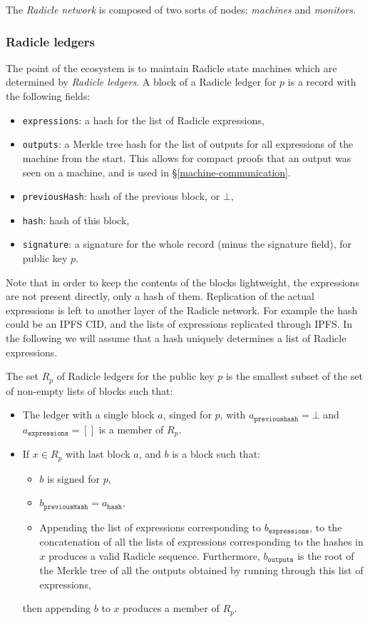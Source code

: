 \documentclass[a4paper, oneside, 10pt]{amsart}
\begin{document}
The \emph{Radicle network} is composed of two sorts of nodes: \emph{machines}
and \emph{monitors}.

\subsubsection{Radicle ledgers}

The point of the ecosystem is to maintain Radicle state machines which are
determined by \emph{Radicle ledgers}. A block of a Radicle ledger for $p$ is a
record with the following fields:
\begin{itemize}
\item
  \texttt{expressions}: a hash for the list of Radicle expressions,
\item
  \texttt{outputs}: a Merkle tree hash for the list of outputs for all
  expressions of the machine from the start. This allows for compact proofs that
  an output was seen on a machine, and is used in \S\ref{machine-communication}.
\item
  \texttt{previousHash}: hash of the previous block, or $\bot$,
\item
  \texttt{hash}: hash of this block,
\item
  \texttt{signature}: a signature for the whole record (minus the signature
  field), for public key $p$.
\end{itemize}

Note that in order to keep the contents of the blocks lightweight, the
expressions are not present directly, only a hash of them. Replication of the
actual expressions is left to another layer of the Radicle network. For example
the hash could be an IPFS CID, and the lists of expressions replicated through
IPFS. In the following we will assume that a hash uniquely determines a list of
Radicle expressions.

The set $R_p$ of Radicle ledgers for the public key $p$ is the smallest subset
of the set of non-empty lists of blocks such that:
\begin{itemize}
\item
  The ledger with a single block $a$, singed for $p$, with
  $a_\mathtt{previoushash} = \bot$ and $a_\mathtt{expressions} = []$ is a member
  of $R_p$.
\item
  If $x \in R_p$ with last block $a$, and $b$ is a block such that:
  \begin{itemize}
  \item
    $b$ is signed for $p$,
  \item
    $b_\mathtt{previousHash} = a_\mathtt{hash}$,
  \item
    Appending the list of expressions corresponding to $b_\mathtt{expressions}$,
    to the concatenation of all the lists of expressions corresponding to the
    hashes in $x$ produces a valid Radicle sequence. Furthermore,
    $b_\mathtt{outputs}$ is the root of the Merkle tree of all the outputs
    obtained by running through this list of expressions,
  \end{itemize}
  then appending $b$ to $x$ produces a member of $R_p$.
\end{itemize}
\end{document}
